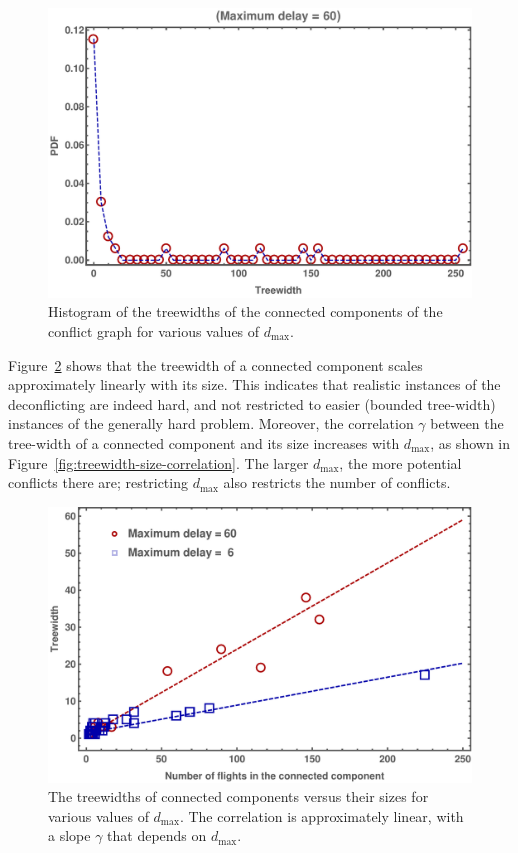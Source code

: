 \begin{figure}
\includegraphics[width=\columnwidth]{pics/instances/treewidth_histogram.pdf}
\caption[Histogram of connected component treewidths]{Histogram of the treewidths of the connected components of the conflict graph for various values of $d_{\max}$.}
\label{fig:hist-tws}
\end{figure}

Figure~\ref{fig:tw-vs-CC-size} shows that the treewidth of a connected component scales approximately linearly with its size.
This indicates that realistic instances of the deconflicting are indeed hard, and not restricted to easier (bounded tree-width) instances of the generally hard problem.
Moreover, the correlation $\gamma$ between the tree-width of a connected component and its size increases with $d_{\max}$, as shown in Figure~\ref{fig:treewidth-size-correlation}.
The larger $d_{\max}$, the more potential conflicts there are;
restricting $d_{\max}$ also restricts the number of conflicts.

\begin{figure}
\includegraphics[width=\columnwidth]{pics/instances/treewidth_connectivity.pdf}
\caption[Correlation between connected component size and treewidth]{
The treewidths of connected components versus their sizes for various values of $d_{\max}$.
The correlation is approximately linear, with a slope $\gamma$ that depends on $d_{\max}$.
}
\label{fig:tw-vs-CC-size}
\end{figure}

